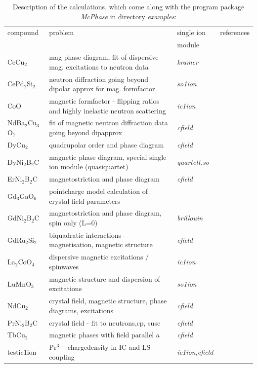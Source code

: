 \documentclass[twoside]{article}
\newcommand{\prg}{\sl}
\begin{document}
\begin{table}[thb] 
\begin{center}  
\caption {Description of the calculations, which come along with the program package {\prg McPhase} in directory {\prg %
examples}:}   
\label{examples}   
\begin{tabular} 
{l|l|l|l}
compound & problem & single ion & references \\ 
        &          & module  &             \\
\hline
CeCu$_2$  & mag phase diagram, fit of dispersive mag. excitations to neutron data & {\prg kramer}\index{kramer} & %
\cite{loewenhaupt06-775,schedler03-1313} \\
CePd$_2$Si$_2$ & neutron diffraction going beyond dipolar approx for mag. formfactor & {\prg %
so1ion}&\cite{rotter09-140405} \\
CoO & magnetic formfactor - flipping ratios  and  highly inelastic neutron scattering  &{\prg  ic1ion} & \\
NdBa$_2$Cu$_3$O$_7$ & fit of magnetic neutron diffraction data going beyond dipapprox & {\prg cfield}\index{cfield} & %
\cite{rotter09-140405} \\
DyCu$_2$ & quadrupolar order and phase diagram & {\prg cfield}\index{cfield}&\cite{yoshida98-1421} \\
DyNi$_2$B$_2$C & magnetic phase diagram, special single ion module (quasiquartet) & {\prg %
quartett.so}\index{quartett.so}& \\
ErNi$_2$B$_2$C & magnetostriction and phase diagram & {\prg cfield}&\cite{doerr02-5609}\\
Gd$_3$GaO$_6$  & pointcharge model calculation of crystal field parameters & & \\ 
GdNi$_2$B$_2$C & magnetostriction and phase diagram, spin only (L=0) & {\prg brillouin}\index{brillouin}& %
\cite{doerr02-5609}\\
GdRu$_2$Si$_2$ & biquadratic interactions - magnetisation, magnetic structure & {\prg cfield} & \\
La$_2$CoO$_4$ & dispersive magnetic excitations / spinwaves &{\prg  ic1ion} & \cite{lewtas10-184420}\\
LuMnO$_3$ &  magnetic structure and dispersion of excitations & {\prg so1ion} & \cite{lewtas10-184420} \\
NdCu$_2$  & crystal field, magnetic structure, phase diagrams, excitations & {\prg cfield}& %
\cite{loewenhaupt95-491,loewenhaupt96-499,rotter00-29,rotter02-751,rotter02-8885} \\
PrNi$_2$B$_2$C & crystal field - fit to neutrons,cp, susc & {\prg cfield}&\cite{mazumdar08-144422}\\
TbCu$_2$ & magnetic phases with field parallel $a$ & {\prg cfield} \\
testic1ion & Pr$^{3+}$ chargedensity in IC and LS coupling & {\prg ic1ion,cfield} \\
 \end{tabular}
\end{center}   
\end{table}
\end{document}
